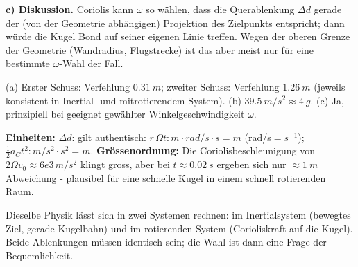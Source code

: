 \textbf{c) Diskussion.} Coriolis kann $\omega$ so wählen, dass die
Querablenkung $\Delta d$ gerade der (von der Geometrie abhängigen) Projektion
des Zielpunkts entspricht; dann würde die Kugel Bond auf seiner eigenen Linie
treffen. Wegen der oberen Grenze der Geometrie (Wandradius, Flugstrecke) ist
das aber meist nur für eine bestimmte $\omega$-Wahl der Fall.

\begin{ergebnis}
(a) Erster Schuss: Verfehlung $\qty{0.31}{m}$; zweiter Schuss: Verfehlung
$\qty{1.26}{m}$ (jeweils konsistent in Inertial- und mitrotierendem System).
(b) $\qty{39.5}{m/s^2}\approx\qty{4}{g}$.
(c) Ja, prinzipiell bei geeignet gewählter Winkelgeschwindigkeit $\omega$.
\end{ergebnis}

\begin{kontrolle}
\textbf{Einheiten:} $\Delta d$: gilt authentisch:
$r\,\Omega t: m \cdot rad/s\cdot s = m$ (rad/s$=s^{-1}$); $\frac12 a_C t^2:
m/s^2\cdot s^2=m$. \checkmark
\textbf{Grössenordnung:} Die Coriolisbeschleunigung von $2\Omega v_0\approx
6e3\,m/s^2$ klingt gross, aber bei $t\approx\qty{0.02}{s}$ ergeben sich nur
$\approx\qty{1}{m}$ Abweichung - plausibel für eine schnelle Kugel in einem
schnell rotierenden Raum.
\end{kontrolle}

\begin{merksatz}
Dieselbe Physik lässt sich in zwei Systemen rechnen: im Inertialsystem
(bewegtes Ziel, gerade Kugelbahn) und im rotierenden System (Corioliskraft auf
die Kugel). Beide Ablenkungen müssen identisch sein; die Wahl ist dann eine
Frage der Bequemlichkeit.
\end{merksatz}